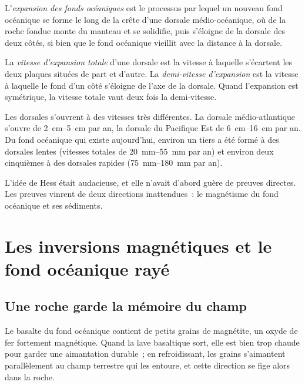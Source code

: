 \begin{definition}\label{def:g11:drift-to-spreading:spreading}
L'\emph{expansion des fonds océaniques}
est le processus par lequel un
nouveau fond océanique se forme le long de la crête d'une dorsale
médio-océanique, où de la roche fondue monte du manteau et se solidifie,
puis s'éloigne de la dorsale des deux côtés, si bien que le fond océanique
vieillit avec la distance à la dorsale.
\end{definition}

\begin{definition}\label{def:g11:drift-to-spreading:spreading-rate}
La \emph{vitesse d'expansion totale} d'une
dorsale est la vitesse à laquelle s'écartent les deux plaques situées de
part et d'autre. La \emph{demi-vitesse d'expansion} est la vitesse à
laquelle le fond d'un côté s'éloigne de l'axe de la dorsale. Quand
l'expansion est symétrique, la vitesse totale vaut deux fois la
demi-vitesse.
\end{definition}

Les dorsales s'ouvrent à des vitesses très différentes. La dorsale
médio-atlantique s'ouvre de \qtyrange{2}{5}{cm} par an, la dorsale du
Pacifique Est de \qtyrange{6}{16}{cm} par an. Du fond océanique qui existe
aujourd'hui, environ un tiers a été formé à des dorsales lentes (vitesses
totales de \qtyrange{20}{55}{mm} par an) et environ deux cinquièmes à des
dorsales rapides (\qtyrange{75}{180}{mm} par an).

L'idée de Hess était audacieuse, et elle n'avait d'abord guère de preuves
directes. Les preuves vinrent de deux directions inattendues~: le magnétisme
du fond océanique et ses sédiments.

\section{Les inversions magnétiques et le fond océanique rayé}

\subsection{Une roche garde la mémoire du champ}

Le basalte du fond océanique contient de petits grains de magnétite, un
oxyde de fer fortement magnétique. Quand la lave basaltique sort, elle est
bien trop chaude pour garder une aimantation durable~; en refroidissant,
les grains s'aimantent parallèlement au champ terrestre qui les entoure, et
cette direction se fige alors dans la roche.

